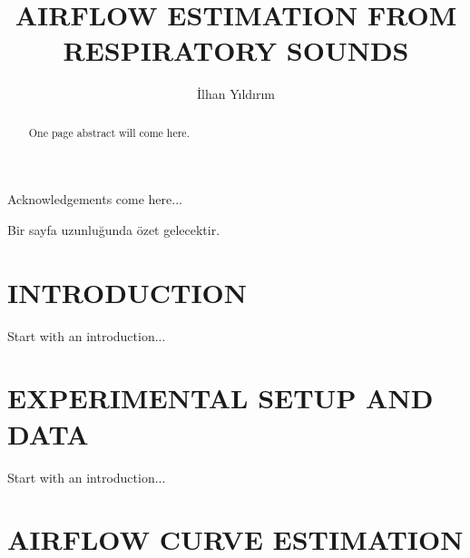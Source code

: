\documentclass[a4paper,onesided,12pt]{report}
\title{AIRFLOW ESTIMATION FROM RESPIRATORY SOUNDS}
\author{İlhan Yıldırım}
\begin{document}
\makemstitle %
\makeapprovalpage
\begin{acknowledgements}
Acknowledgements come here...
\end{acknowledgements}
\begin{abstract}
One page abstract will come here.  
\end{abstract}
\begin{ozet}
Bir sayfa uzunluğunda özet gelecektir.
\end{ozet}
\tableofcontents
\listoffigures
\listoftables
\begin{symbols}
%

\sym{}{}
\sym{ }{}

\end{symbols}

\begin{abbreviations}
\end{abbreviations}


\chapter{INTRODUCTION}
\label{chapter:introduction}
Start with an introduction...

\chapter{EXPERIMENTAL SETUP AND DATA}
\label{chapter:introduction}
Start with an introduction...

%
\chapter{AIRFLOW CURVE ESTIMATION}
\label{chapter:airflow-curve-estimation}
 
\end{document}
